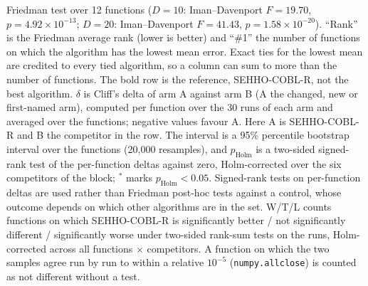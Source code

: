 \begin{table}[htbp]
\begin{flushleft}
Friedman test over 12 functions ($D=10$: Iman--Davenport $F=19.70$, $p=4.92\times10^{-13}$; $D=20$: Iman--Davenport $F=41.43$, $p=1.58\times10^{-20}$). ``Rank'' is the Friedman average rank (lower is better) and ``\#1'' the number of functions on which the algorithm has the lowest mean error. Exact ties for the lowest mean are credited to every tied algorithm, so a column can sum to more than the number of functions. The bold row is the reference, SEHHO-COBL-R, not the best algorithm. $\delta$ is Cliff's delta of arm A against arm B (A the changed, new or first-named arm), computed per function over the 30 runs of each arm and averaged over the functions; negative values favour A. Here A is SEHHO-COBL-R and B the competitor in the row. The interval is a 95\% percentile bootstrap interval over the functions (20{,}000 resamples), and $p_{\text{Holm}}$ is a two-sided signed-rank test of the per-function deltas against zero, Holm-corrected over the six competitors of the block; $^{*}$ marks $p_{\text{Holm}}<0.05$. Signed-rank tests on per-function deltas are used rather than Friedman post-hoc tests against a control, whose outcome depends on which other algorithms are in the set. W/T/L counts functions on which SEHHO-COBL-R is significantly better / not significantly different / significantly worse under two-sided rank-sum tests on the runs, Holm-corrected across all functions $\times$ competitors. A function on which the two samples agree run by run to within a relative $10^{-5}$ (\texttt{numpy.allclose}) is counted as not different without a test.
\end{flushleft}
\end{table}
